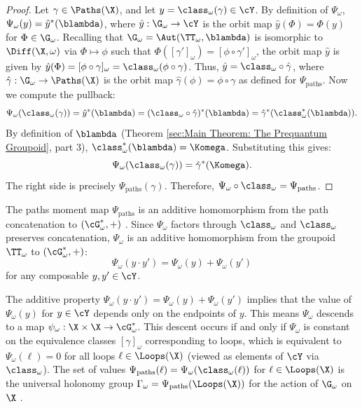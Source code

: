 \begin{article}
    \begin{proof}
      Let $\gamma \in \Paths(\X)$,
      and let $y = \class_\omega(\gamma) \in \cY$.
      By definition of $\Psi_\omega$, $\Psi_\omega(y) = \hat y^*(\blambda)$,
      where $\hat y : \G_\omega \to \cY$ is the orbit map $\hat y(\Phi) = \Phi(y)$ for $\Phi \in \G_\omega$.
      Recalling that $\G_\omega = \Aut(\TT_\omega, \blambda)$ is isomorphic to $\Diff(\X,\omega)$ via $\Phi \mapsto \phi$ such that $\Phi([\gamma']_\omega) = [\phi \circ \gamma']_\omega$,
      the orbit map $\hat y$ is given by $\hat y(\Phi) = [\phi \circ \gamma]_\omega = \class_\omega(\phi \circ \gamma)$.
      Thus,
      $\hat y = \class_\omega \circ \hat\gamma$,
      where $\hat\gamma : \G_\omega \to \Paths(\X)$ is the orbit map $\hat\gamma(\phi) = \phi \circ \gamma$ as defined for $\Psi_{\text{paths}}$.
      Now we compute the pullback:
      $$
        \Psi_\omega(\class_\omega(\gamma)) = \hat y^*(\blambda) = (\class_\omega \circ \hat\gamma)^*(\blambda) = \hat\gamma^*(\class_\omega^*(\blambda)).
        $$
      By definition of $\blambda$ (Theorem \ref{sec:Main Theorem: The Prequantum Groupoid}, part 3),
      $\class_\omega^*(\blambda) = \Komega$.
      Substituting this gives:
      $$
        \Psi_\omega(\class_\omega(\gamma)) = \hat\gamma^*(\Komega).
        $$
      The right side is precisely $\Psi_{\text{paths}}(\gamma)$.
      Therefore, $\Psi_\omega \circ \class_\omega = \Psi_{\text{paths}}$.
    \end{proof}
    \smallskip
    
    The paths moment map $\Psi_{\text{paths}}$ is an additive homomorphism from the path concatenation to $(\cG_\omega^*, +)$ \cite[Art.~4.3]{PIZ10}.
    Since $\Psi_\omega$ factors through $\class_\omega$ and $\class_\omega$ preserves concatenation,
    $\Psi_\omega$ is an additive homomorphism from the groupoid $\TT_\omega$ to $(\cG_\omega^*, +)$:
    $$
      \Psi_\omega(y \cdot y') = \Psi_\omega(y) + \Psi_\omega(y')
      $$
    for any composable $y, y' \in \cY$.
    
    The additive property $\Psi_\omega(y \cdot y') = \Psi_\omega(y) + \Psi_\omega(y')$ implies that the value of $\Psi_\omega(y)$ for $y \in \cY$ depends only on the endpoints of $y$.
    This means $\Psi_\omega$ descends to a map $\psi_\omega : \X \times \X \to \cG_\omega^*$.
    This descent occurs if and only if $\Psi_\omega$ is constant on the equivalence classes $[\gamma]_\omega$ corresponding to loops,
    which is equivalent to $\Psi_\omega(\ell)=0$ for all loops $\ell \in \Loops(\X)$ (viewed as elements of $\cY$ via $\class_\omega$).
    The set of values $\Psi_{\text{paths}}(\ell) = \Psi_\omega(\class_\omega(\ell))$ for $\ell \in \Loops(\X)$ is the universal holonomy group $\Gamma_\omega = \Psi_{\text{paths}}(\Loops(\X))$ for the action of $\G_\omega$ on $\X$ \cite[Art.~3.7]{PIZ10}.
    

\end{article}
